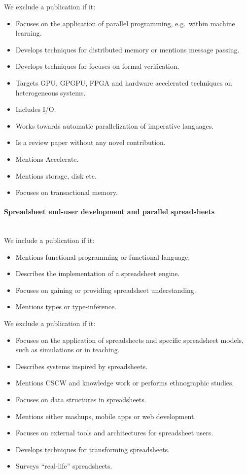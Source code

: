 \documentclass[a4paper]{article}
\begin{document}
We exclude a publication if it:

\begin{itemize}
\item Focuses on the application of parallel programming, e.g.\ within
  machine learning.
\item Develops techniques for distributed memory or mentions message
  passing.
\item Develops techniques for focuses on formal verification.
\item Targets GPU, GPGPU, FPGA and hardware accelerated techniques on
  heterogeneous systems.
\item Includes I/O.
\item Works towards automatic parallelization of imperative languages.
\item Is a review paper without any novel contribution.
\item Mentions Accelerate.
\item Mentions storage, disk etc.
\item Focuses on transactional memory.
\end{itemize}

\paragraph{Spreadsheet end-user development and parallel spreadsheets}
~\\

We include a publication if it:

\begin{itemize}
\item Mentions functional programming or functional language.
\item Describes the implementation of a spreadsheet engine.
\item Focuses on gaining or providing spreadsheet understanding.
\item Mentions types or type-inference.
\end{itemize}

We exclude a publication if it:

\begin{itemize}
\item Focuses on the application of spreadsheets and specific
  spreadsheet models, such as simulations or in teaching.
\item Describes systems inspired by spreadsheets.
\item Mentions CSCW and knowledge work or performs ethnographic
  studies.
\item Focuses on data structures in spreadsheets.
\item Mentions either mashups, mobile apps or web development.
\item Focuses on external tools and architectures for spreadsheet
  users.
\item Develops techniques for transforming spreadsheets.
\item Surveys ``real-life'' spreadsheets.
\end{itemize}
\end{document}
